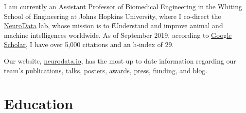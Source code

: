 \documentclass[10pt,colorlinks=true,urlcolor=blue]{moderncv}
\begin{document}
\maketitle

I am currently an Assistant Professor of Biomedical Engineering in the Whiting School of Engineering at Johns Hopkins University, where I co-direct the \href{https://neurodata.io/}{NeuroData} lab, whose mission is to fUnderstand and improve animal and machine intelligences worldwide. As of September 2019, according to \href{https://scholar.google.com/citations?user=DWPfdT4AAAAJ&hl=en&oi=ao}{Google Scholar}, I have over 5,000 citations and an h-index of 29.  

\vspace{10pt}

Our website, \href{https://neurodata.io}{neurodata.io},  has the most up to date information regarding our team's
% 
	  \href{https://neurodata.io/publications/}{publications},
	  \href{https://neurodata.io/talks/}{talks},
	  \href{https://neurodata.io/presentations/#posters}{posters},
	  \href{https://neurodata.io/awards}{awards},
	  \href{https://neurodata.io/press}{press},
	  \href{https://github.com/jovo/cv/raw/master/CP_Vogelstein.pdf}{funding}, and
	  \href{https://blog.neurodata.io/}{blog}.

\section{Education}





\end{document}
